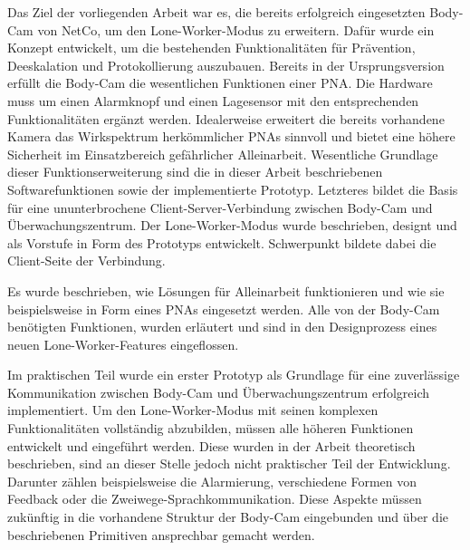 \documentclass[thesis.tex]{subfiles}
\begin{document}


Das Ziel der vorliegenden Arbeit war es, die bereits erfolgreich eingesetzten Body-Cam von NetCo, um den Lone-Worker-Modus zu erweitern.
Dafür wurde ein Konzept entwickelt, um die bestehenden Funktionalitäten für Prävention, Deeskalation und Protokollierung auszubauen.
Bereits in der Ursprungsversion erfüllt die Body-Cam die wesentlichen Funktionen einer PNA.
Die Hardware muss um einen Alarmknopf und einen Lagesensor mit den entsprechenden Funktionalitäten ergänzt werden.
Idealerweise erweitert die bereits vorhandene Kamera das Wirkspektrum herkömmlicher PNAs sinnvoll und bietet eine höhere Sicherheit im Einsatzbereich gefährlicher Alleinarbeit.
Wesentliche Grundlage dieser Funktionserweiterung sind die in dieser Arbeit beschriebenen Softwarefunktionen sowie der implementierte Prototyp.
Letzteres bildet die Basis für eine ununterbrochene Client-Server-Verbindung zwischen Body-Cam und Überwachungszentrum.
Der Lone-Worker-Modus wurde beschrieben, designt und als Vorstufe in Form des Prototyps entwickelt.
Schwerpunkt bildete dabei die Client-Seite der Verbindung.

Es wurde beschrieben, wie Lösungen für Alleinarbeit funktionieren und wie sie beispielsweise in Form eines PNAs eingesetzt werden.
Alle von der Body-Cam benötigten Funktionen, wurden erläutert und sind in den Designprozess eines neuen Lone-Worker-Features eingeflossen.

Im praktischen Teil wurde ein erster Prototyp als Grundlage für eine zuverlässige Kommunikation zwischen Body-Cam und Überwachungszentrum erfolgreich implementiert.
Um den Lone-Worker-Modus mit seinen komplexen Funktionalitäten vollständig abzubilden, müssen alle höheren Funktionen entwickelt und eingeführt werden.
Diese wurden in der Arbeit theoretisch beschrieben, sind an dieser Stelle jedoch nicht praktischer Teil der Entwicklung.
Darunter zählen beispielsweise die Alarmierung, verschiedene Formen von Feedback oder die Zweiwege-Sprachkommunikation.
Diese Aspekte müssen zukünftig in die vorhandene Struktur der Body-Cam eingebunden und über die beschriebenen Primitiven ansprechbar gemacht werden.
\end{document}
